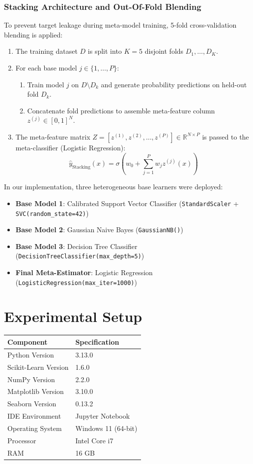 \documentclass[12pt,a4paper]{article}
\begin{document}
\subsubsection*{Stacking Architecture and Out-Of-Fold Blending}
To prevent target leakage during meta-model training, 5-fold cross-validation blending is applied:
\begin{enumerate}
\item The training dataset $D$ is split into $K=5$ disjoint folds $D_1, \dots, D_K$.
\item For each base model $j \in \{1, \dots, P\}$:
\begin{enumerate}
\item Train model $j$ on $D \setminus D_k$ and generate probability predictions on held-out fold $D_k$.
\item Concatenate fold predictions to assemble meta-feature column $z^{(j)} \in [0, 1]^N$.
\end{enumerate}
\item The meta-feature matrix $Z = [z^{(1)}, z^{(2)}, \dots, z^{(P)}] \in \mathbb{R}^{N \times P}$ is passed to the meta-classifier (Logistic Regression):
\begin{equation}
\hat{y}_{\text{Stacking}}(x) = \sigma \left( w_0 + \sum_{j=1}^{P} w_j z^{(j)}(x) \right)
\end{equation}
\end{enumerate}

In our implementation, three heterogeneous base learners were deployed:
\begin{itemize}
\item \textbf{Base Model 1}: Calibrated Support Vector Classifier (\texttt{StandardScaler} + \texttt{SVC(random\_state=42)})
\item \textbf{Base Model 2}: Gaussian Naive Bayes (\texttt{GaussianNB()})
\item \textbf{Base Model 3}: Decision Tree Classifier (\texttt{DecisionTreeClassifier(max\_depth=5)})
\item \textbf{Final Meta-Estimator}: Logistic Regression (\texttt{LogisticRegression(max\_iter=1000)})
\end{itemize}

\section{Experimental Setup}

\begin{tabular}{ll}
\toprule
\textbf{Component} & \textbf{Specification} \\
\midrule
Python Version & 3.13.0 \\
Scikit-Learn Version & 1.6.0 \\
NumPy Version & 2.2.0 \\
Matplotlib Version & 3.10.0 \\
Seaborn Version & 0.13.2 \\
IDE Environment & Jupyter Notebook \\
Operating System & Windows 11 (64-bit) \\
Processor & Intel Core i7 \\
RAM & 16 GB \\
\bottomrule
\end{tabular}
\end{document}
